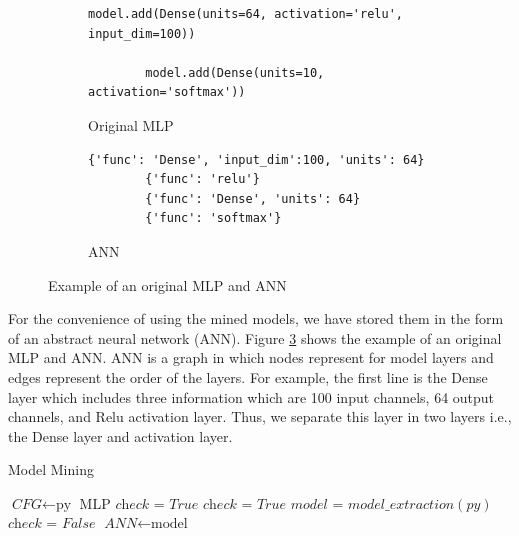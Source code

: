 \begin{figure}
	\centering
	\begin{subfigure}[b]{.45\linewidth}
		\begin{lstlisting}[basicstyle=\tiny,numberblanklines=false]
		model.add(Dense(units=64, activation='relu', input_dim=100)) 
		
		model.add(Dense(units=10, activation='softmax'))
		\end{lstlisting}
		\caption{Original MLP}
		\label{fig:originalCNN}
	\end{subfigure}
	\begin{subfigure}[b]{.45\linewidth}
		\begin{lstlisting}[basicstyle=\tiny,numberblanklines=false]	
		{'func': 'Dense', 'input_dim':100, 'units': 64} 
		{'func': 'relu'}
		{'func': 'Dense', 'units': 64}
		{'func': 'softmax'}
		\end{lstlisting}
		\caption{ANN}
		\label{fig:convertedCNN}
	\end{subfigure}
	\caption{Example of an original MLP and ANN}
	\label{fig:converted}
\end{figure}



For the convenience of using the mined models, we have stored them in the form of an abstract neural network (ANN). Figure \ref{fig:converted} shows the example of an original MLP and ANN. ANN is a graph in which nodes represent for model layers and edges represent the order of the layers. For example, the first line is the Dense layer which includes three information which are 100 input channels, 64 output channels, and Relu activation layer. Thus, we separate this layer in two layers i.e., the Dense layer and activation layer.
\begin{algorithm}
	\caption{Model Mining}\label{euclid}
	\begin{algorithmic}[1]
			\State $\textit{CFG} \gets \text{py}$
			\State \Return MLP
		\EndProcedure
		\State $\textit{check = True} $
			\State $\textit{check = True} $
			\State $model$ = $model\_extraction(py)$ 
					\State $\textit{check = False} $
				\EndIf
			\EndFor
				\State $\textit{ANN}  \gets \text{model}$
			\EndIf
		\EndFor
		
		\EndProcedure	
	\end{algorithmic}
\end{algorithm}



